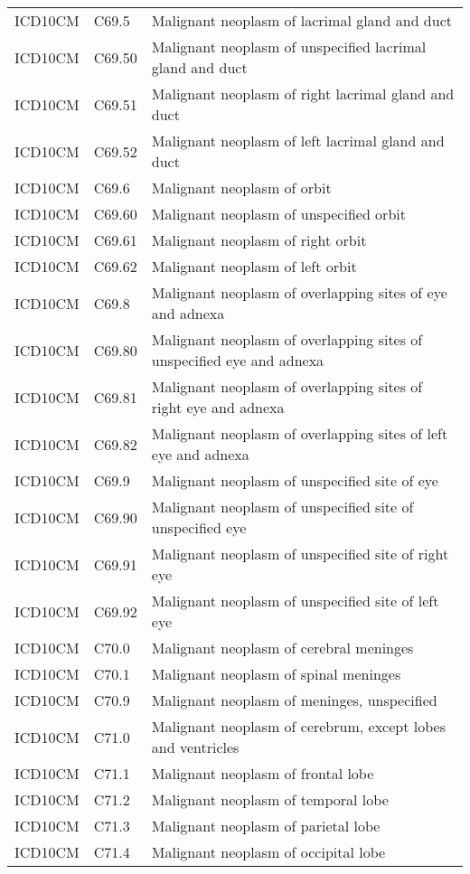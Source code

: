 \begin{longtable}{p{}p{}p{}}
  ICD10CM & C69.5 & Malignant neoplasm of lacrimal gland and duct \\ 
  ICD10CM & C69.50 & Malignant neoplasm of unspecified lacrimal gland and duct \\ 
  ICD10CM & C69.51 & Malignant neoplasm of right lacrimal gland and duct \\ 
  ICD10CM & C69.52 & Malignant neoplasm of left lacrimal gland and duct \\ 
  ICD10CM & C69.6 & Malignant neoplasm of orbit \\ 
  ICD10CM & C69.60 & Malignant neoplasm of unspecified orbit \\ 
  ICD10CM & C69.61 & Malignant neoplasm of right orbit \\ 
  ICD10CM & C69.62 & Malignant neoplasm of left orbit \\ 
  ICD10CM & C69.8 & Malignant neoplasm of overlapping sites of eye and adnexa \\ 
  ICD10CM & C69.80 & Malignant neoplasm of overlapping sites of unspecified eye and adnexa \\ 
  ICD10CM & C69.81 & Malignant neoplasm of overlapping sites of right eye and adnexa \\ 
  ICD10CM & C69.82 & Malignant neoplasm of overlapping sites of left eye and adnexa \\ 
  ICD10CM & C69.9 & Malignant neoplasm of unspecified site of eye \\ 
  ICD10CM & C69.90 & Malignant neoplasm of unspecified site of unspecified eye \\ 
  ICD10CM & C69.91 & Malignant neoplasm of unspecified site of right eye \\ 
  ICD10CM & C69.92 & Malignant neoplasm of unspecified site of left eye \\ 
  ICD10CM & C70.0 & Malignant neoplasm of cerebral meninges \\ 
  ICD10CM & C70.1 & Malignant neoplasm of spinal meninges \\ 
  ICD10CM & C70.9 & Malignant neoplasm of meninges, unspecified \\ 
  ICD10CM & C71.0 & Malignant neoplasm of cerebrum, except lobes and ventricles \\ 
  ICD10CM & C71.1 & Malignant neoplasm of frontal lobe \\ 
  ICD10CM & C71.2 & Malignant neoplasm of temporal lobe \\ 
  ICD10CM & C71.3 & Malignant neoplasm of parietal lobe \\ 
  ICD10CM & C71.4 & Malignant neoplasm of occipital lobe \\ 

\end{longtable}
